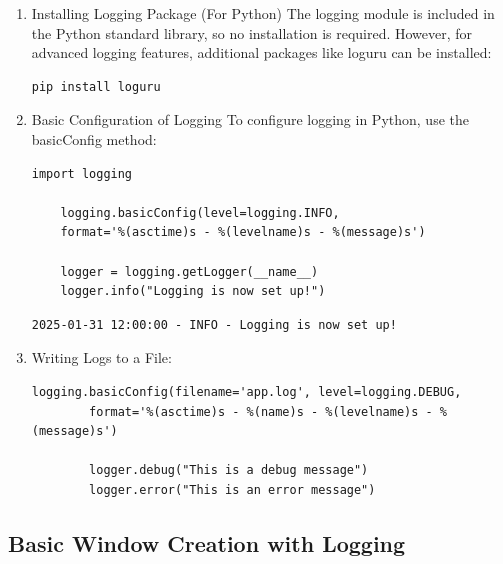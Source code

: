 \begin{enumerate}
	\item Installing Logging Package (For Python) The logging module is included in the Python standard library, so no installation is required. However, for advanced logging features, additional packages like loguru can be installed:
	\begin{lstlisting}[style=bashstyle]
	pip install loguru
	\end{lstlisting}
	\item Basic Configuration of Logging To configure logging in Python, use the basicConfig method:
		\begin{lstlisting}[style=pythonstyle]
	import logging
	
	logging.basicConfig(level=logging.INFO,
	format='%(asctime)s - %(levelname)s - %(message)s')
	
	logger = logging.getLogger(__name__)
	logger.info("Logging is now set up!")
	\end{lstlisting}
	\bigskip
		\begin{lstlisting}[style=bashstyle]
		2025-01-31 12:00:00 - INFO - Logging is now set up!
	\end{lstlisting}
	\item Writing Logs to a File:
		\begin{lstlisting}[style=pythonstyle]
		logging.basicConfig(filename='app.log', level=logging.DEBUG,
		format='%(asctime)s - %(name)s - %(levelname)s - %(message)s')
		
		logger.debug("This is a debug message")
		logger.error("This is an error message")
	\end{lstlisting}
\end{enumerate}

\subsection{Basic Window Creation with Logging}


